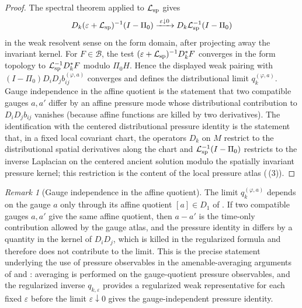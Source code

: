 \documentclass[11pt]{amsart}
\numberwithin{equation}{section}
\theoremstyle{plain}
\theoremstyle{definition}
\theoremstyle{remark}
\newtheorem{remark}[remark]{Remark}
\begin{document}
\begin{proof}
The spectral theorem applied to \(\mathcal L_{\rm sp}\) gives
\[
   D_k(\varepsilon+\mathcal L_{\rm sp})^{-1}(I-\Pi_0)
   \xrightarrow{\;\varepsilon\downarrow0\;}
   D_k\mathcal L_{\rm sp}^{-1}(I-\Pi_0)
\]
in the weak resolvent sense on the form domain, after projecting away the
invariant kernel.  For \(F\in\mathcal B\), the test
\((\varepsilon+\mathcal L_{\rm sp})^{-1}D_k^*F\) converges in the form topology to
\(\mathcal L_{\rm sp}^{-1}D_k^*F\) modulo \(\Pi_0H\).  Hence the displayed weak pairing
with \((I-\Pi_0)D_iD_jb_{ij}^{(\varphi,a)}\) converges and defines the
distributional limit \(q_k^{(\varphi,a)}\).  Gauge independence in the affine
quotient is the statement that two compatible
gauges \(a,a'\) differ by an affine pressure mode whose distributional
contribution to \(D_iD_j b_{ij}\) vanishes (because affine functions are
killed by two derivatives).  The identification with the centered
distributional pressure identity is the statement that, in a fixed local
covariant chart, the operators \(D_k\) on \(M\) restrict to the
distributional spatial derivatives along the chart and
\(\mathcal L_{\rm sp}^{-1}(I-\Pi_0)\) restricts to the inverse Laplacian on the
centered ancient solution modulo the spatially invariant pressure kernel; this
restriction is the
content of the local pressure atlas
(\,(3)).
\end{proof}

\begin{remark}[Gauge independence in the affine quotient]
\label{rem:generator-gauge-independence}
The limit \(q_k^{(\varphi,a)}\) depends on the gauge \(a\) only through
its affine quotient \([a]\in D_1\) of
.  If two compatible gauges
\(a,a'\) give the same affine quotient, then \(a-a'\) is the time-only
contribution allowed by the gauge atlas, and the pressure identity in
 differs by a quantity in the
kernel of \(D_iD_j\), which is killed in the regularized formula and
therefore does not contribute to the limit.  This is the precise
statement underlying the use of pressure observables in the
amenable-averaging arguments of
 and
: averaging is performed on the
gauge-quotient pressure observables, and the regularized inverse
\(q_{k,\varepsilon}\) provides a regularized weak representative for each fixed
\(\varepsilon\) before the limit \(\varepsilon\downarrow0\) gives the
gauge-independent pressure identity.
\end{remark}
\end{document}
